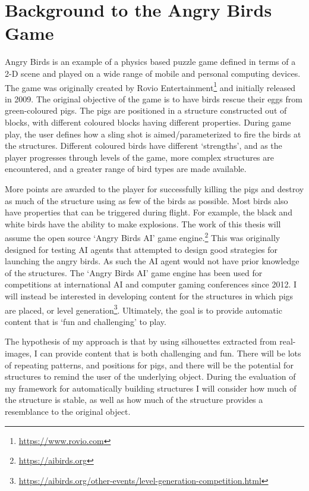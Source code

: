 \documentclass{dalthesis}
\begin{document}
\chapter{Background to the Angry Birds Game}\label{sec:angrybirds}

Angry Birds is an example of a physics based puzzle game defined in terms of a 2-D scene and played on a wide range of mobile and personal computing devices. The game was originally created by Rovio Entertainment\footnote{\url{https://www.rovio.com}} and initially released in 2009. The original objective of the game is to have birds rescue their eggs from green-coloured pigs. The pigs are positioned in a structure constructed out of blocks, with different coloured blocks having different properties. During game play, the user defines how a sling shot is aimed/parameterized to fire the birds at the structures. Different coloured birds have different `strengths', and as the player progresses through levels of the game, more complex structures are encountered, and a greater range of bird types are made available.

More points are awarded to the player for successfully killing the pigs and destroy as much of the structure using as few of the birds as possible. Most birds also have properties that can be triggered during flight. For example, the black and white birds have the ability to make explosions.
The work of this thesis will assume the open source `Angry Birds AI' game engine.\footnote{\url{https://aibirds.org}} This was originally designed for testing AI agents that attempted to design good strategies for launching the angry birds. As such the AI agent would not have prior knowledge of the structures. The `Angry Birds AI' game engine has been used for competitions at international AI and computer gaming conferences since 2012. I will instead be interested in developing content for the structures in which pigs are placed, or level generation\footnote{\url{https://aibirds.org/other-events/level-generation-competition.html}}. Ultimately, the goal is to provide automatic content that is `fun and challenging' to play.

The hypothesis of my approach is that by using silhouettes extracted from real-images, I can provide content that is both challenging and fun. There will be lots of repeating patterns, and positions for pigs, and there will be the potential for structures to remind the user of the underlying object. During the evaluation of my framework for automatically building structures I will consider how much of the structure is stable, as well as how much of the structure provides a resemblance to the original object.
\end{document}
